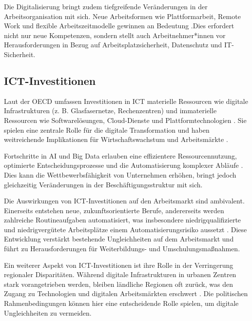 Die Digitalisierung bringt zudem tiefgreifende Veränderungen in der Arbeitsorganisation mit sich. 
Neue Arbeitsformen wie Plattformarbeit, Remote Work und flexible Arbeitszeitmodelle gewinnen an 
Bedeutung \parencite[vgl.][S. 58–60]{schwab2016thefourth}.Dies erfordert nicht nur neue 
Kompetenzen, sondern stellt auch Arbeitnehmer*innen vor Herausforderungen in Bezug auf 
Arbeitsplatzsicherheit, Datenschutz und \ac{IT}-Sicherheit. 


\subsection{ICT-Investitionen}

Laut der OECD umfassen Investitionen in \ac{ICT} materielle Ressourcen wie digitale 
Infrastrukturen (z. B. Glasfasernetze, Rechenzentren) und immaterielle Ressourcen wie 
Softwarelösungen, Cloud-Dienste und Plattformtechnologien \parencite{oecd2022ict}. Sie spielen 
eine zentrale Rolle für die digitale Transformation und haben weitreichende Implikationen für 
Wirtschaftswachstum und Arbeitsmärkte \parencite[vgl.][S. 50]{oecd2019measuring}. 

Fortschritte in \ac{AI} und Big Data erlauben eine effizientere Ressourcennutzung, optimierte 
Entscheidungsprozesse und die Automatisierung komplexer Abläufe 
\parencite[vgl.][S. 120]{oecd2019measuring}. Dies kann die Wettbewerbsfähigkeit von Unternehmen 
erhöhen, bringt jedoch gleichzeitig Veränderungen in der Beschäftigungsstruktur mit sich. 

Die Auswirkungen von \ac{ICT}-Investitionen auf den Arbeitsmarkt sind ambivalent. Einerseits 
entstehen neue, zukunftsorientierte Berufe, andererseits werden zahlreiche Routineaufgaben 
automatisiert, was insbesondere niedrigqualifizierte und  niedrigvergütete Arbeitsplätze einem 
Automatisierungsrisiko aussetzt \parencite[vgl.][S. 42]{frey2013thefuture}. Diese Entwicklung 
verstärkt bestehende Ungleichheiten auf dem Arbeitsmarkt und führt zu Herausforderungen für 
Weiterbildungs- und Umschulungsmaßnahmen. 

Ein weiterer Aspekt von \ac{ICT}-Investitionen ist ihre Rolle in der Verringerung regionaler 
Disparitäten. Während digitale Infrastrukturen in urbanen Zentren stark vorangetrieben werden, 
bleiben ländliche Regionen oft zurück, was den Zugang zu Technologien und digitalen 
Arbeitsmärkten erschwert \parencite[vgl.][S. 106]{oecd2019measuring}. Die politischen 
Rahmenbedingungen können hier eine entscheidende Rolle spielen, um digitale Ungleichheiten zu 
vermeiden. 

